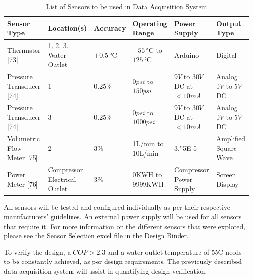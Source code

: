 \medskip
\begin{table}[H]
\centering
\caption{List of Sensors to be used in Data Acquisition System}
\begin{tabular}{|P{26mm}|P{26mm}|P{15mm}|P{27mm}|P{23mm}|P{20mm}|}
    \hline
    Sensor Type & Location(s) & Accuracy & Operating Range & Power Supply & Output Type \\
    \hline
    Thermistor [73]            & 1, 2, 3, Water Outlet        & $\pm \SI{0.5}{\celsius}$ & $\SI{-55}{\celsius}$ to $\SI{125}{\celsius}$ & Arduino  & Digital \\
    Pressure Transducer [74]   & 1                            & 0.25\%                   & $0psi$ to $150psi$ & $9V$ to $30V$ DC at $<10mA$ & Analog $0V$ to $5V$ DC \\
    Pressure Transducer [74]   & 3                            & 0.25\%                   & $0psi$ to $1000psi$ & $9V$ to $30V$ DC at $<10mA$ & Analog $0V$ to $5V$ DC \\
    Volumetric Flow Meter [75] & 2                            & 3\%                      & 1L/min to 10L/min & 3.75E-5 & Amplified Square Wave \\
    Power Meter [76]           & Compressor Electrical Outlet & 3\%                      & 0KWH to 9999KWH & Compressor Power Supply  & Screen Display \\
    \hline
\end{tabular}
\end{table}

\medskip
All sensors will be tested and configured individually as per their respective manufacturers’ guidelines. An external power supply will be used for all sensors that require it. For more information on the different sensors that were explored, please see the Sensor Selection excel file in the Design Binder.

\medskip
To verify the design, a $COP > 2.3$ and a water outlet temperature of 55\textdegree C needs to be constantly achieved, as per design requirements. The previously described data acquisition system will assist in quantifying design verification.